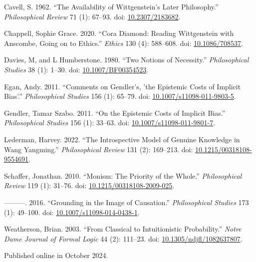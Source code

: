 \documentclass[
  10pt,
  letterpaper,
  DIV=11,
  numbers=noendperiod,
  twoside]{scrartcl}
\newlength{\cslhangindent}
\newenvironment{CSLReferences}[2] %
 {\begin{list}{}{%
  \setlength{\itemindent}{0pt}
  \setlength{\leftmargin}{0pt}
  \setlength{\parsep}{0pt}
  \ifodd #1
   \setlength{\leftmargin}{\cslhangindent}
   \setlength{\itemindent}{-1\cslhangindent}
  \fi
  \setlength{\itemsep}{#2\baselineskip}}}
 {\end{list}}
\begin{document}
\label{refs}
\begin{CSLReferences}{1}{0}
Cavell, S. 1962. {``The Availability of Wittgenstein's Later
Philosophy.''} \emph{Philosophical Review} 71 (1): 67--93. doi:
\href{https://doi.org/10.2307/2183682}{10.2307/2183682}.

Chappell, Sophie Grace. 2020. {``Cora Diamond: Reading Wittgenstein with
Anscombe, Going on to Ethics.''} \emph{Ethics} 130 (4): 588--608. doi:
\href{https://doi.org/10.1086/708537}{10.1086/708537}.

Davies, M, and L Humberstone. 1980. {``Two Notions of Necessity.''}
\emph{Philosophical Studies} 38 (1): 1--30. doi:
\href{https://doi.org/10.1007/BF00354523}{10.1007/BF00354523}.

Egan, Andy. 2011. {``Comments on Gendler's, 'the Epistemic Costs of
Implicit Bias'.''} \emph{Philosophical Studies} 156 (1): 65--79. doi:
\href{https://doi.org/10.1007/s11098-011-9803-5}{10.1007/s11098-011-9803-5}.

Gendler, Tamar Szabo. 2011. {``On the Epistemic Costs of Implicit
Bias.''} \emph{Philosophical Studies} 156 (1): 33--63. doi:
\href{https://doi.org/10.1007/s11098-011-9801-7}{10.1007/s11098-011-9801-7}.

Lederman, Harvey. 2022. {``The Introspective Model of Genuine Knowledge
in Wang Yangming.''} \emph{Philosophical Review} 131 (2): 169--213. doi:
\href{https://doi.org/10.1215/00318108-9554691}{10.1215/00318108-9554691}.

Schaffer, Jonathan. 2010. {``Monism: The Priority of the Whole.''}
\emph{Philosophical Review} 119 (1): 31--76. doi:
\href{https://doi.org/10.1215/00318108-2009-025}{10.1215/00318108-2009-025}.

---------. 2016. {``Grounding in the Image of Causation.''}
\emph{Philosophical Studies} 173 (1): 49--100. doi:
\href{https://doi.org/10.1007/s11098-014-0438-1}{10.1007/s11098-014-0438-1}.

Weatherson, Brian. 2003. {``From Classical to Intuitionistic
Probability.''} \emph{Notre Dame Journal of Formal Logic} 44 (2):
111--23. doi:
\href{https://doi.org/10.1305/ndjfl/1082637807}{10.1305/ndjfl/1082637807}.

\end{CSLReferences}



\noindent Published online in October 2024.
\end{document}
